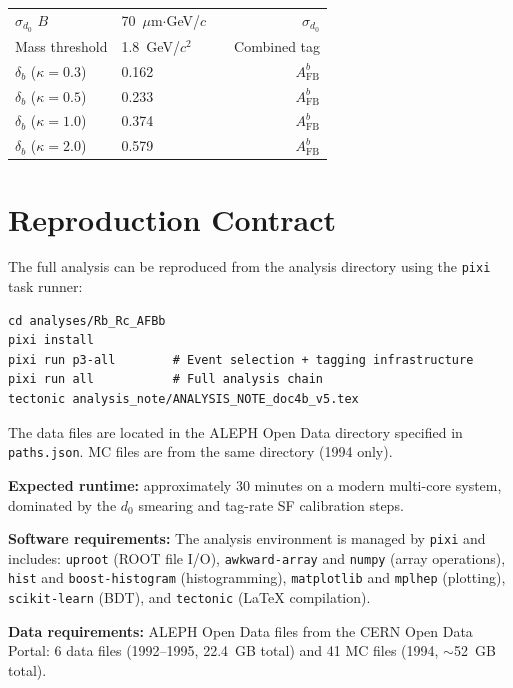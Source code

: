 \documentclass[11pt,a4paper]{article}
\begin{document}
\begin{table}[htbp]
\begin{tabular}{lllr}
$\sigma_{d_0}$ $B$ & 70~$\mu$m$\cdot$GeV/$c$ & \cite{ALEPH:Rb:precise} & $\sigma_{d_0}$ \\
Mass threshold & 1.8~GeV/$c^2$ & \cite{ALEPH:Rb:1996} & Combined tag \\
$\delta_b$ ($\kappa = 0.3$) & 0.162 & \cite{LEP:EWWG:2005} & $A_\text{FB}^b$ \\
$\delta_b$ ($\kappa = 0.5$) & 0.233 & \cite{LEP:EWWG:2005} & $A_\text{FB}^b$ \\
$\delta_b$ ($\kappa = 1.0$) & 0.374 & \cite{LEP:EWWG:2005} & $A_\text{FB}^b$ \\
$\delta_b$ ($\kappa = 2.0$) & 0.579 & \cite{LEP:EWWG:2005} & $A_\text{FB}^b$ \\
\bottomrule
\end{tabular}
\end{table}

\section{Reproduction Contract}
\label{app:reproduction}

The full analysis can be reproduced from the analysis directory
using the \texttt{pixi} task runner:

\begin{verbatim}
cd analyses/Rb_Rc_AFBb
pixi install
pixi run p3-all        # Event selection + tagging infrastructure
pixi run all           # Full analysis chain
tectonic analysis_note/ANALYSIS_NOTE_doc4b_v5.tex
\end{verbatim}

\noindent
The data files are located in the ALEPH Open Data directory
specified in \texttt{paths.json}.
MC files are from the same directory (1994 only).

\noindent
\textbf{Expected runtime:} approximately 30 minutes on a modern
multi-core system, dominated by the $d_0$ smearing and tag-rate
SF calibration steps.

\noindent
\textbf{Software requirements:} The analysis environment is
managed by \texttt{pixi} and includes: \texttt{uproot} (ROOT file
I/O), \texttt{awkward-array} and \texttt{numpy} (array operations),
\texttt{hist} and \texttt{boost-histogram} (histogramming),
\texttt{matplotlib} and \texttt{mplhep} (plotting),
\texttt{scikit-learn} (BDT), and \texttt{tectonic} (LaTeX
compilation).

\noindent
\textbf{Data requirements:} ALEPH Open Data files from the CERN
Open Data Portal: 6 data files (1992--1995, 22.4~GB total) and
41 MC files (1994, $\sim$52~GB total).
\end{document}
